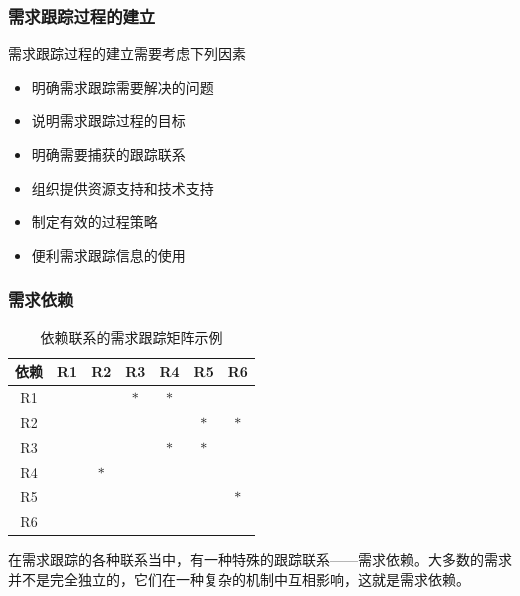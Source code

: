 \subsubsection{需求跟踪过程的建立}
需求跟踪过程的建立需要考虑下列因素
\vspace{-0.8em}
\begin{multicols}{2}
    \begin{itemize}
        \item 明确需求跟踪需要解决的问题
        \item 说明需求跟踪过程的目标
        \item 明确需要捕获的跟踪联系
        \item 组织提供资源支持和技术支持
        \item 制定有效的过程策略
        \item 便利需求跟踪信息的使用
    \end{itemize}
\end{multicols}
\vspace{-1em}


\subsubsection{需求依赖}
\begin{table}
    \centering
    \vspace{-1.5em}
    \begin{tabular}{|c|c|c|c|c|c|c|}
        \hline
        依赖 & R1 & R2 & R3 & R4 & R5 & R6 \\ \hline
        R1 &    &    & $\ast$  & $\ast$  &    &    \\ \hline
        R2 &    &    &    &    & $\ast$  & $\ast$  \\ \hline
        R3 &    &    &    & $\ast$  & $\ast$  &    \\ \hline
        R4 &    & $\ast$  &    &    &    &    \\ \hline
        R5 &    &    &    &    &    & $\ast$  \\ \hline
        R6 &    &    &    &    &    &    \\ \hline
    \end{tabular}
    \caption*{依赖联系的需求跟踪矩阵示例}
    \vspace{-3em}
\end{table}

在需求跟踪的各种联系当中，有一种特殊的跟踪联系——需求依赖。大多数的需求并不是完全独立的，它们在一种复杂的机制中互相影响，这就是需求依赖。

